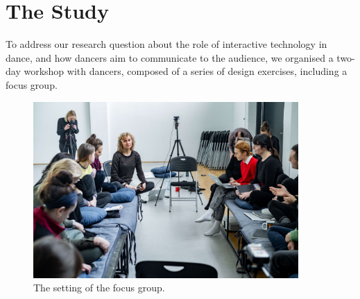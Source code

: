 \section{The Study}

To address our research question about the role of interactive technology in dance, and how dancers aim to communicate to the audience, we organised a two-day workshop with dancers, composed of a series of design exercises, including a focus group.


\begin{figure}
\centering
\includegraphics[width=0.9\textwidth]{Chapters/Figures/preliminary_actions/STL_focus_group_optimized.jpg}
\caption{The setting of the focus group.} \label{fig1}
\end{figure}

